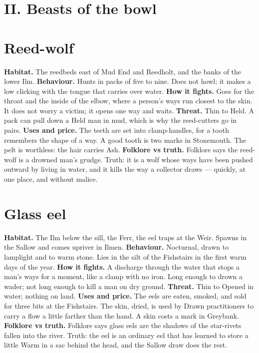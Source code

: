 \documentclass{design/chronicle}
\begin{document}
\CRrule

\section*{II. Beasts of the bowl}

\section*{Reed-wolf}

\textbf{Habitat.} The reedbeds east of Mud End and Reedholt, and the banks of the lower Ilm. \textbf{Behaviour.} Hunts in packs of five to nine. Does not howl; it makes a low clicking with the tongue that carries over water. \textbf{How it fights.} Goes for the throat and the inside of the elbow, where a person’s ways run closest to the skin. It does not worry a victim; it opens one way and waits. \textbf{Threat.} Thin to Held. A pack can pull down a Held man in mud, which is why the reed-cutters go in pairs. \textbf{Uses and price.} The teeth are set into clamp-handles, for a tooth remembers the shape of a way. A good tooth is two marks in Stonemouth. The pelt is worthless: the hair carries Ash. \textbf{Folklore vs truth.} Folklore says the reed-wolf is a drowned man’s grudge. Truth: it is a wolf whose ways have been pushed outward by living in water, and it kills the way a collector draws — quickly, at one place, and without malice.

\section*{Glass eel}

\textbf{Habitat.} The Ilm below the sill, the Ferr, the eel traps at the Weir. Spawns in the Sallow and comes upriver in Ilmen. \textbf{Behaviour.} Nocturnal, drawn to lamplight and to warm stone. Lies in the silt of the Fishstairs in the first warm days of the year. \textbf{How it fights.} A discharge through the water that stops a man’s ways for a moment, like a clamp with no iron. Long enough to drown a wader; not long enough to kill a man on dry ground. \textbf{Threat.} Thin to Opened in water; nothing on land. \textbf{Uses and price.} The eels are eaten, smoked, and sold for three bits at the Fishstairs. The skin, dried, is used by Drawn practitioners to carry a flow a little farther than the hand. A skin costs a mark in Greybank. \textbf{Folklore vs truth.} Folklore says glass eels are the shadows of the star-rivets fallen into the river. Truth: the eel is an ordinary eel that has learned to store a little Warm in a sac behind the head, and the Sallow draw does the rest.
\end{document}
